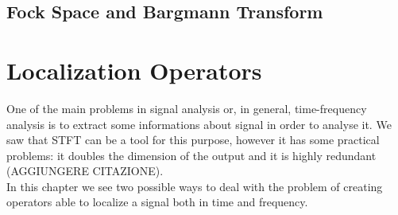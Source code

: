 \documentclass[corpo=11pt, stile=classica, tipotesi=custom,
greek, evenboxes, english]{toptesi}
\numberwithin{equation}{chapter}
\begin{document}
\section{Fock Space and Bargmann Transform}\label{section Fock Space and Bargmann transform}


\chapter{Localization Operators}\label{chapter localization operators}
{\color{red}One of the main problems in signal analysis or, in general, time-frequency analysis is to extract some informations about signal in order to analyse it. We saw that STFT can be a tool for this purpose, however it has some practical problems: it doubles the dimension of the output and it is highly redundant (AGGIUNGERE CITAZIONE).}\\
In this chapter we see two possible ways to deal with the problem of creating operators able to localize a signal both in time and frequency.
\end{document}
